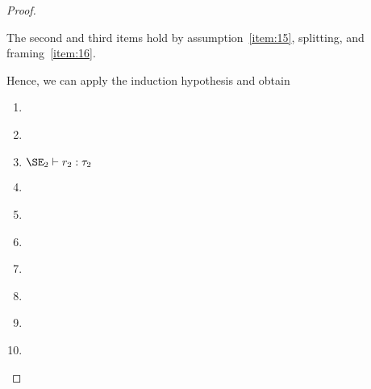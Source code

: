 \begin{proof}
\begin{enumerate}[({A2-}1)]
    The second and third items hold by assumption~\ref{item:15},
    splitting, and framing~\ref{item:16}.
  \end{enumerate}
  Hence, we can apply the induction hypothesis and obtain
  \begin{enumerate}[({R2}-1)]
  \item\label{item:17} 
  \item\label{item:18} 
  \item\label{item:19} $\SE_2 \vdash r_2 : \tau_2$
  \item\label{item:20} 
  \item\label{item:21} 
  \item\label{item:22} 
  \item\label{item:23} 
  \item\label{item:25} 
  \item\label{item:29} 
  \item\label{item:31} 
  \end{enumerate}


\end{proof}
